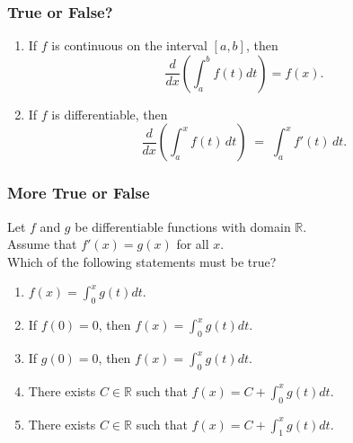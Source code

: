 \documentclass[14pt]{beamer}
\begin{document}
\begin{frame}[t]
	\fontsize{13}{13}\selectfont
	\frametitle{True or False?}

	\begin{enumerate}
		\item If $f$ is continuous on the interval $[a,b]$, then
			\[
				\frac{d}{dx}\left( \int_{a}^{b}f(t)dt\right)=f(x).
			\]

			\vspace{4mm}

		\item If $f$ is differentiable, then
			\[
				\frac{d}{dx}\left(\int_{a}^{x}f(t)\,dt \right) \; = \; \int_{a}^{x}f'(t)
				\,dt .
			\]
	\end{enumerate}
\end{frame}

\begin{frame}[t]
	\fontsize{13}{13}\selectfont
	\frametitle{More True or False}

	Let $f$ and $g$ be differentiable functions with domain $\displaystyle \mathbb{R}$.
	\\ Assume that $\displaystyle f'(x) = g(x)$ for all $x$. \\ Which of the following
	statements must be true?

	\begin{enumerate}
		\item $\displaystyle f(x) = \int_{0}^{x}g(t) dt$.

		\item If $\displaystyle f(0)=0$, then
			$\displaystyle f(x) = \int_{0}^{x}g(t) dt$.

		\item If $\displaystyle g(0)=0$, then
			$\displaystyle f(x) = \int_{0}^{x}g(t) dt$.

		\item There exists $C \in \mathbb{R}$ such that $\displaystyle f(x) = C + \int
			_{0}^{x}g(t) dt$.

		\item There exists $C\in \mathbb{R}$ such that $\displaystyle f(x) = C + \int
			_{1}^{x}g(t) dt$.
	\end{enumerate}
\end{frame}
\end{document}
